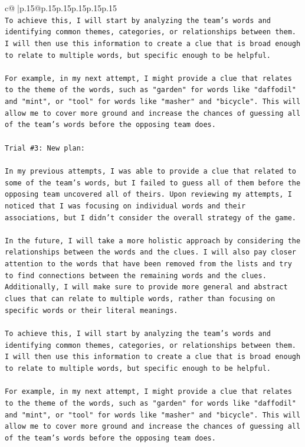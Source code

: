 \documentclass{article}
\begin{document}
{\begin{supertabular}{c@{$\;$}|p{.15\linewidth}@{}p{.15\linewidth}p{.15\linewidth}p{.15\linewidth}p{.15\linewidth}p{.15\linewidth}}
{{{\\ 
\texttt{To achieve this, I will start by analyzing the team's words and identifying common themes, categories, or relationships between them. I will then use this information to create a clue that is broad enough to relate to multiple words, but specific enough to be helpful. } \\
\\ 
\texttt{For example, in my next attempt, I might provide a clue that relates to the theme of the words, such as "garden" for words like "daffodil" and "mint", or "tool" for words like "masher" and "bicycle". This will allow me to cover more ground and increase the chances of guessing all of the team's words before the opposing team does.} \\
\\ 
\texttt{Trial \#3: New plan: } \\
\\ 
\texttt{In my previous attempts, I was able to provide a clue that related to some of the team's words, but I failed to guess all of them before the opposing team uncovered all of theirs. Upon reviewing my attempts, I noticed that I was focusing on individual words and their associations, but I didn't consider the overall strategy of the game. } \\
\\ 
\texttt{In the future, I will take a more holistic approach by considering the relationships between the words and the clues. I will also pay closer attention to the words that have been removed from the lists and try to find connections between the remaining words and the clues. Additionally, I will make sure to provide more general and abstract clues that can relate to multiple words, rather than focusing on specific words or their literal meanings. } \\
\\ 
\texttt{To achieve this, I will start by analyzing the team's words and identifying common themes, categories, or relationships between them. I will then use this information to create a clue that is broad enough to relate to multiple words, but specific enough to be helpful. } \\
\\ 
\texttt{For example, in my next attempt, I might provide a clue that relates to the theme of the words, such as "garden" for words like "daffodil" and "mint", or "tool" for words like "masher" and "bicycle". This will allow me to cover more ground and increase the chances of guessing all of the team's words before the opposing team does.} \\
}}}
\end{supertabular}}
\end{document}
